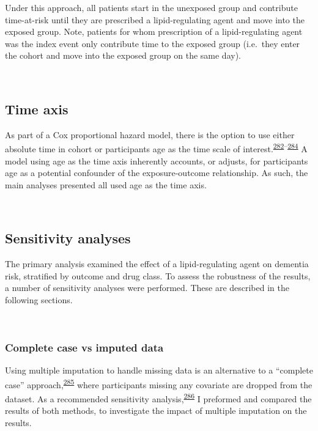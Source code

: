 \documentclass[a4paper, twoside]{templates/ociamthesis}
\begin{document}
Under this approach, all patients start in the unexposed group and contribute time-at-risk until they are prescribed a lipid-regulating agent and move into the exposed group. Note, patients for whom prescription of a lipid-regulating agent was the index event only contribute time to the exposed group (i.e.~they enter the cohort and move into the exposed group on the same day).

~

\hypertarget{cprd-time-axis}{%
\subsection{Time axis}\label{cprd-time-axis}}

As part of a Cox proportional hazard model, there is the option to use either absolute time in cohort or participants age as the time scale of interest.\textsuperscript{\protect\hyperlink{ref-lamarca1998}{282}--\protect\hyperlink{ref-pencina2007}{284}} A model using age as the time axis inherently accounts, or adjusts, for participants age as a potential confounder of the exposure-outcome relationship. As such, the main analyses presented all used age as the time axis.

~

\hypertarget{sensitivity-analyses}{%
\subsection{Sensitivity analyses}\label{sensitivity-analyses}}

The primary analysis examined the effect of a lipid-regulating agent on dementia risk, stratified by outcome and drug class. To assess the robustness of the results, a number of sensitivity analyses were performed. These are described in the following sections.

~

\hypertarget{complete-case-vs-imputed-data}{%
\subsubsection{Complete case vs imputed data}\label{complete-case-vs-imputed-data}}

Using multiple imputation to handle missing data is an alternative to a ``complete case'' approach,\textsuperscript{\protect\hyperlink{ref-pigott2001review}{285}} where participants missing any covariate are dropped from the dataset. As a recommended sensitivity analysis,\textsuperscript{\protect\hyperlink{ref-hughes2019}{286}} I preformed and compared the results of both methods, to investigate the impact of multiple imputation on the results.
\end{document}
